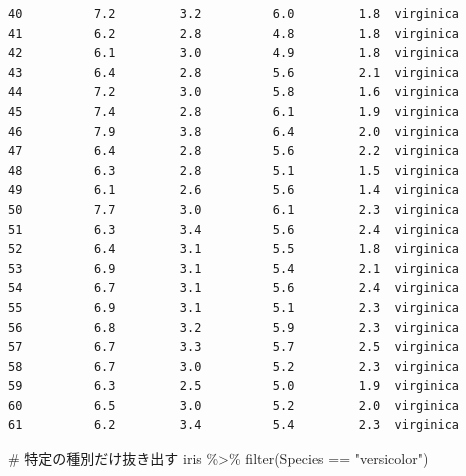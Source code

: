 \documentclass[
  a4paper,
]{ltjsbook}
\newenvironment{Shaded}{\begin{snugshade}}{\end{snugshade}}
\newcommand{\CommentTok}[1]{\textcolor[rgb]{0.37,0.37,0.37}{#1}}
\newcommand{\FunctionTok}[1]{\textcolor[rgb]{0.28,0.35,0.67}{#1}}
\newcommand{\NormalTok}[1]{\textcolor[rgb]{0.00,0.23,0.31}{#1}}
\newcommand{\SpecialCharTok}[1]{\textcolor[rgb]{0.37,0.37,0.37}{#1}}
\newcommand{\StringTok}[1]{\textcolor[rgb]{0.13,0.47,0.30}{#1}}
\begin{document}
\begin{verbatim}
40          7.2         3.2          6.0         1.8  virginica
41          6.2         2.8          4.8         1.8  virginica
42          6.1         3.0          4.9         1.8  virginica
43          6.4         2.8          5.6         2.1  virginica
44          7.2         3.0          5.8         1.6  virginica
45          7.4         2.8          6.1         1.9  virginica
46          7.9         3.8          6.4         2.0  virginica
47          6.4         2.8          5.6         2.2  virginica
48          6.3         2.8          5.1         1.5  virginica
49          6.1         2.6          5.6         1.4  virginica
50          7.7         3.0          6.1         2.3  virginica
51          6.3         3.4          5.6         2.4  virginica
52          6.4         3.1          5.5         1.8  virginica
53          6.9         3.1          5.4         2.1  virginica
54          6.7         3.1          5.6         2.4  virginica
55          6.9         3.1          5.1         2.3  virginica
56          6.8         3.2          5.9         2.3  virginica
57          6.7         3.3          5.7         2.5  virginica
58          6.7         3.0          5.2         2.3  virginica
59          6.3         2.5          5.0         1.9  virginica
60          6.5         3.0          5.2         2.0  virginica
61          6.2         3.4          5.4         2.3  virginica
\end{verbatim}

\begin{Shaded}
\begin{Highlighting}[]
\CommentTok{\# 特定の種別だけ抜き出す}
\NormalTok{iris }\SpecialCharTok{\%\textgreater{}\%} \FunctionTok{filter}\NormalTok{(Species }\SpecialCharTok{==} \StringTok{"versicolor"}\NormalTok{)}
\end{Highlighting}
\end{Shaded}
\end{document}
